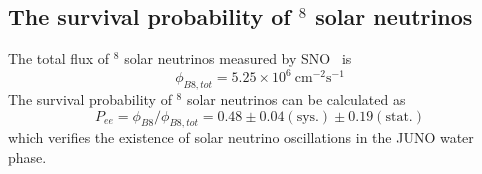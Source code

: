 \subsection{The survival probability of $^8$ solar neutrinos}
The total flux of $^8$ solar neutrinos measured by SNO~\cite{SNO5.25} is
$$\phi_{B8,tot}=5.25\times10^6~\text{cm}^{-2}\text{s}^{-1}$$
The survival probability of $^8$ solar neutrinos can be calculated as
$$P_{ee}=\phi_{B8}/\phi_{B8,tot}=0.48\pm0.04(\text{sys.})\pm0.19(\text{stat.})$$
which verifies the existence of solar neutrino oscillations in the JUNO water phase.